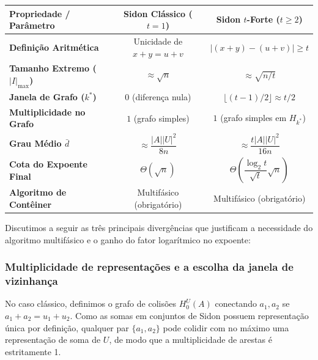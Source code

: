 \documentclass[reqno,a4paper,12pt]{amsart}
\begin{document}
\begin{center}
  \renewcommand{\arraystretch}{1.5}
  \begin{tabular}{p{4.5cm}cc}
    \hline
    \textbf{Propriedade / Parâmetro}        & \textbf{Sidon Clássico ($t=1$)} & \textbf{Sidon $t$-Forte ($t \ge 2$)}                    \\
    \hline
    \textbf{Definição Aritmética}           & Unicidade de $x+y=u+v$          & $|(x+y)-(u+v)| \ge t$                                   \\
    \textbf{Tamanho Extremo ($|I|_{\max}$)} & $\approx \sqrt{n}$              & $\approx \sqrt{n/t}$                                    \\
    \textbf{Janela de Grafo ($k^*$)}        & $0$ (diferença nula)            & $\lfloor(t-1)/2\rfloor \approx t/2$                     \\
    \textbf{Multiplicidade no Grafo}        & $1$ (grafo simples)             & $1$ (grafo simples em $H_{k^*}$)                        \\
    \textbf{Grau Médio $\bar{d}$}           & $\approx \dfrac{|A||U|^2}{8n}$  & $\approx \dfrac{t|A||U|^2}{16n}$                        \\
    \textbf{Cota do Expoente Final}         & $\Theta(\sqrt{n})$              & $\Theta\left(\dfrac{\log_2 t}{\sqrt{t}}\sqrt{n}\right)$ \\
    \textbf{Algoritmo de Contêiner}         & Multifásico (obrigatório)       & Multifásico (obrigatório)                               \\
    \hline
  \end{tabular}
\end{center}

\bigskip

Discutimos a seguir as três principais divergências que justificam a necessidade do algoritmo multifásico e o ganho do fator logarítmico no expoente:

\subsubsection{Multiplicidade de representações e a escolha da janela de vizinhança}
No caso clássico, definimos o grafo de colisões $H_0^U(A)$ conectando $a_1, a_2$ se $a_1+a_2 = u_1+u_2$. Como as somas em conjuntos de Sidon possuem representação única por definição, qualquer par $\{a_1,a_2\}$ pode colidir com no máximo uma representação de soma de $U$, de modo que a multiplicidade de arestas é estritamente 1.
\end{document}
